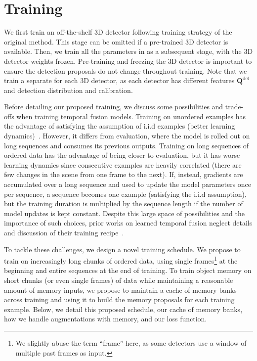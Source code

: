 

\section{Training} \label{sec:method-training}

We first train an off-the-shelf 3D detector following training strategy of the original method.
This stage can be omitted if a pre-trained 3D detector is available.
Then, we train all the parameters in \ourmodel{} as a subsequent stage,
with the 3D detector weights frozen.
Pre-training and freezing the 3D detector
is important to ensure the detection proposals
do not change throughout \ourmodel{} training.
Note that we train a separate \ourmodel{} for each 3D detector,
as each detector has different features $\mathbf{Q}^{\textrm{det}}$ and detection distribution and calibration.

Before detailing our proposed \ourmodel{} training, we discuss some possibilities and trade-offs when training temporal fusion models.
Training on unordered examples has the advantage of
satisfying the assumption of i.i.d examples (better learning dynamics)~\cite{kiefer1952stochastic,robbins1951stochastic}.
However, it differs from evaluation, where the model is rolled out on long sequences and consumes its previous outputs.
Training on long sequences of ordered data has the advantage of being closer to evaluation, but it has worse learning dynamics since consecutive examples are heavily correlated (there are few changes in the scene from one frame to the next).
If, instead, gradients are accumulated over a long sequence and used to update the model parameters once per sequence, a sequence becomes one example (satisfying the i.i.d assumption), but the
training duration is multiplied by the sequence length if the number of model updates is kept constant.
Despite this large space of possibilities and the importance of such choices, prior works on learned temporal fusion neglect details and discussion of their training recipe~\cite{he2023lef,li2023modar,huang2024ptt,he2023msf}.

To tackle these challenges, we design a novel training schedule.
We propose to train \ourmodel{} on increasingly long chunks of ordered data, using single frames\footnote{We slightly abuse the term ``frame'' here, as some detectors use a window of multiple past frames as input.}
at the beginning and entire sequences at the end of training.
To train object memory on short chunks (or even single frames) of data while maintaining a reasonable amount of memory inputs,
we propose to maintain a cache of memory banks across training and using it to build the memory proposals for each training example.
Below, we detail this proposed schedule, our cache of memory banks, how we handle augmentations with memory, and our loss function.

